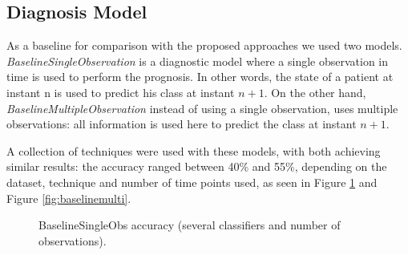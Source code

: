 \subsection{Diagnosis Model}
\label{subsection:diagnosis}

As a baseline for comparison with the proposed approaches we used two models. \emph{BaselineSingleObservation} is a diagnostic model
 where a single observation in time is used to perform the prognosis. In other words, the state of a patient at instant n is
 used to predict his class at instant $n+1$. On the other hand, \emph{BaselineMultipleObservation} instead of using a single observation,
 uses multiple observations: all information is used here to predict the class at instant $n+1$.

A collection of techniques were used with these models, with both achieving similar results: the accuracy ranged between 40\% and 55\%,
 depending on the dataset, technique and number of time points used, as seen in Figure \ref{fig:baselinesingle} and Figure \ref{fig:baselinemulti}.
 
 \begin{figure}[h]
  \begin{subfigmatrix}{2}
  \end{subfigmatrix}
  \caption{BaselineSingleObs accuracy (several classifiers and number of observations).}
  \label{fig:baselinesingle}
\end{figure}

